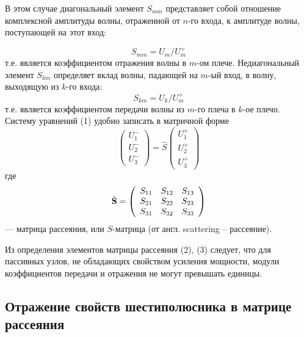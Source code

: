 \documentclass[a4paper,12pt]{article}
\begin{document}
В этом случае диагональный элемент $S_{mm}$ представляет собой отношение комплексной амплитуды волны, отраженной от $n$-го входа, к амплитуде волны, поступающей на этот вход:

\begin{equation}
	S _ { m m } = U _ { m } / U _ { m } ^ { + }
\end{equation}
т.е. является коэффициентом отражения волны в $m$-ом плече. Недиагональный элемент $S_{km}$ определяет вклад волны, падающей на $m$-ый вход, в волну, выходящую из $k$-го входа:
\begin{equation}
	S _ { k m } = U _ { k } / U _ { m } ^ { + }
\end{equation}
т.е. является коэффициентом передачи волны из $m$-го плеча в $k$-ое плечо. Систему уравнений (1) удобно записать в матричной форме
\begin{equation}
	\left( \begin{array} { c } { U _ { 1 } ^ { - } } \\ { U _ { 2 } ^ { - } } \\ { U _ { 3 } ^ { - } } \end{array} \right) = \hat { S } \left( \begin{array} { l } { U _ { 1 } ^ { + } } \\ { U _ { 2 } ^ { + } } \\ { U _ { 3 } ^ { + } } \end{array} \right)
\end{equation}
где
\begin{equation}
	\hat { \mathbf { S } } = \left( \begin{array} { c c c } { S _ { 11 } } & { S _ { 12 } } & { S _ { 13 } } \\ { S _ { 21 } } & { S _ { 22 } } & { S _ { 23 } } \\ { S _ { 31 } } & { S _ { 32 } } & { S _ { 33 } } \end{array} \right)
\end{equation}
--- матрица рассеяния, или $S$-матрица (от англ. scattering -- рассеяние).

Из определения элементов матрицы рассеяния (2), (3) следует, что для пассивных узлов, не обладающих свойством усиления мощности, модули коэффициентов передачи и отражения не могут превышать единицы.
\subsection{Отражение свойств шестиполюсника в матрице рассеяния}
\end{document}
